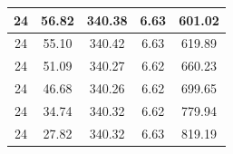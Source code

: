 \begin{table}[H]
{\begin{tabular}{|c|c|c|c|c|}
24                                                & 56.82                             & 340.38                         & 6.63                                                           & 601.02                 \\ \hline
24                                                & 55.10                             & 340.42                         & 6.63                                                           & 619.89                 \\ \hline
24                                                & 51.09                             & 340.27                         & 6.62                                                           & 660.23                 \\ \hline
24                                                & 46.68                             & 340.26                         & 6.62                                                           & 699.65                 \\ \hline
24                                                & 34.74                             & 340.32                         & 6.62                                                           & 779.94                 \\ \hline
24                                                & 27.82                             & 340.32                         & 6.63                                                           & 819.19 
    \\ \hline
   \end{tabular}
}
\end{table}	
